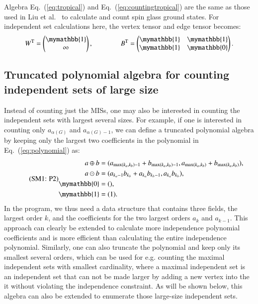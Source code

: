 \documentclass[onefignum, onetabnum]{siamart190516}
\newcommand{\eqname}[1]{\stepcounter{equation}\tag{\theequation : #1}}
\newcommand{\<}{\langle}
\renewcommand{\>}{\rangle}
\newcommand{\Eq}[1]{Eq.~(\ref{#1})}
\newcounter{example}
\begin{document}
Algebra \Eq{eq:tropical} and \Eq{eq:countingtropical} are the same as those used in Liu et al.~\cite{Liu2021} to calculate and count spin glass ground states.
For independent set calculations here, the vertex tensor and edge tensor becomes:
\begin{equation}
    W^{\rm T} = \left(\begin{matrix}
        \mymathbb{1} \\
        \infty
    \end{matrix}\right),   
    \qquad \qquad
        B^{\rm T} = \left(\begin{matrix}
        \mymathbb{1}  & \mymathbb{1} \\
        \mymathbb{1} & \mymathbb{0}
    \end{matrix}\right).
\end{equation}

\subsection{Truncated polynomial algebra for counting independent sets of large size}
Instead of counting just the MISs, one may also be interested in counting the independent sets with largest several sizes.
For example, if one is interested in counting only $a_{\alpha(G)}$ and $a_{\alpha(G)-1}$, we can define a truncated polynomial algebra by keeping only the largest two coefficients in the polynomial in \Eq{eq:polynomial} as:
\begin{equation}
    \eqname{P2}
    \begin{split}
    a \oplus b &= (a_{\max(k_a, k_b)-1} + b_{\max(k_a, k_b)-1}, a_{\max(k_a, k_b)} + b_{\max(k_a, k_b)}),\\
    a \odot b &= (a_{k_a-1} b_{k_b}+a_{k_a} b_{k_b-1}, a_{k_a} b_{k_b}),\\
    \mymathbb{0} &= (), \\
    \mymathbb{1} &= (1).\label{eq:max2poly}
    \end{split}
\end{equation}
In the program, we thus need a data structure that contains three fields, the largest order $k$, and the coefficients for the two largest orders $a_k$ and $a_{k-1}$.
This approach can clearly be extended to calculate more independence polynomial coefficients and is more efficient than calculating the entire independence polynomial.
Similarly, one can also truncate the polynomial and keep only its smallest several orders,
which can be used for e.g. counting the maximal independent sets with smallest cardinality,
where a maximal independent set is an independent set that can not be made larger by adding a new vertex into the it without violating the independence constraint.
As will be shown below, this algebra can also be extended to enumerate those large-size independent sets.
\end{document}
